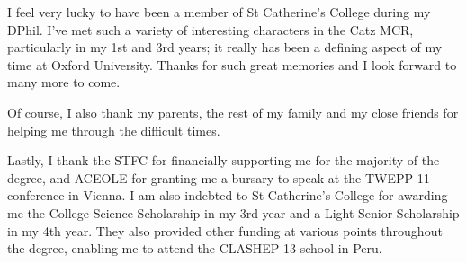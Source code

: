 I feel very lucky to have been a member of St Catherine's College during my DPhil. I've met 
such a variety of interesting characters in the Catz MCR, particularly in my 1st and 3rd 
years; it really has been a defining aspect of my time at Oxford University. Thanks for such 
great memories and I look forward to many more to come.

Of course, I also thank my parents, the rest of my family and my close friends for helping me 
through the difficult times.

Lastly, I thank the STFC for financially supporting me for the majority of the degree, and 
ACEOLE for granting me a bursary to speak at the TWEPP-11 conference in Vienna. I am also 
indebted to St Catherine's College for awarding me the College Science Scholarship in my 3rd 
year and a Light Senior Scholarship in my 4th year. They also provided other funding at 
various points throughout the degree, \eg enabling me to attend the CLASHEP-13 school in Peru.
